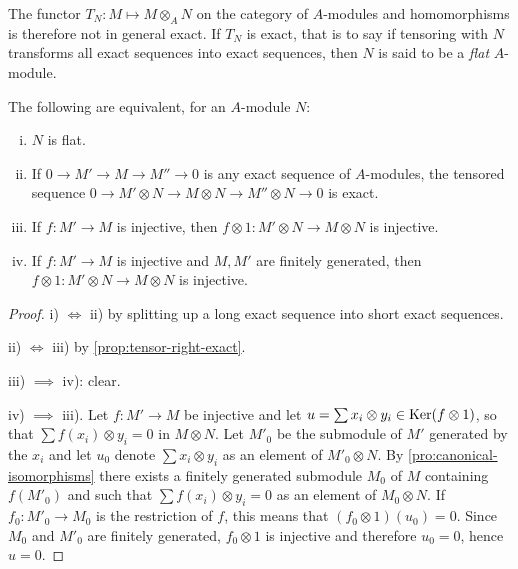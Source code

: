 The functor $T_N \colon M \mapsto M \otimes_A N$ on the category of $A$-modules and homomorphisms is therefore not in general exact. If $T_N$ is exact, that is to say if tensoring with $N$ transforms all exact sequences into exact sequences, then $N$ is said to be a \emph{flat} $A$-module.

\begin{proposition}\label{prop:flat-equivalent}
The following are equivalent, for an $A$-module $N$:
\begin{enumerate}[i)]
    \item $N$ is flat.
    \item If $0 \longrightarrow M' \longrightarrow M \longrightarrow M'' \longrightarrow 0$ is any exact sequence of $A$-modules, the tensored sequence $0 \longrightarrow M' \otimes N \longrightarrow M \otimes N \longrightarrow M'' \otimes N \longrightarrow 0$ is exact.
    \item If $f \colon M' \to M$ is injective, then $f \otimes 1 \colon M' \otimes N \longrightarrow M \otimes N$ is injective.
    \item If $f \colon M' \to M$ is injective and $M, M'$ are finitely generated, then $f \otimes 1 \colon M' \otimes N \to M \otimes N$ is injective.
\end{enumerate}
\end{proposition}

\begin{proof}
i) $\iff$ ii) by splitting up a long exact sequence into short exact sequences.

ii) $\iff$ iii) by \eqref{prop:tensor-right-exact}.

iii) $\implies$ iv): clear.

iv) $\implies$ iii). Let $f \colon M' \to M$ be injective and let $u = \sum x_i \otimes y_i \in \operatorname{Ker}(f \otimes 1)$, so that $\sum f(x_i) \otimes y_i = 0$ in $M \otimes N$. Let $M'_0$ be the submodule of $M'$ generated by the $x_i$ and let $u_0$ denote $\sum x_i \otimes y_i$ as an element of $M'_0 \otimes N$. By \eqref{pro:canonical-isomorphisms} there exists a finitely generated submodule $M_0$ of $M$ containing $f(M'_0)$ and such that $\sum f(x_i) \otimes y_i = 0$ as an element of $M_0 \otimes N$. If $f_0 \colon M'_0 \to M_0$ is the restriction of $f$, this means that $(f_0 \otimes 1)(u_0) = 0$. Since $M_0$ and $M'_0$ are finitely generated, $f_0 \otimes 1$ is injective and therefore $u_0 = 0$, hence $u = 0$.
\end{proof}

